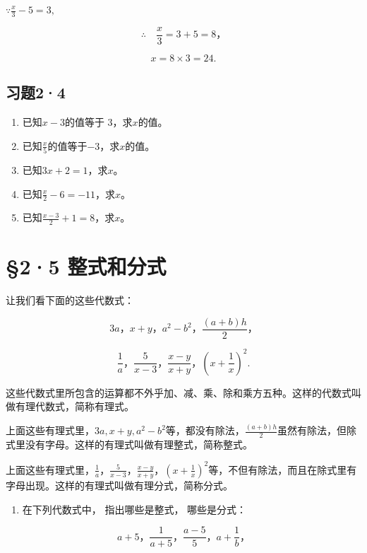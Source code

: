 \(\because \frac{x}{3} - 5 = 3,\)

\[
\therefore \quad \frac{x}{3} = 3 + 5 = 8\text{，}
\]

\[
x = 8 \times 3 = 24.
\]

\subsection{习题2·4}

\begin{enumerate}
\item
  已知\(x - 3\)的值等于 3，求\(x\)的值。
\item
  已知\(\frac{x}{5}\)的值等于\(-3\)，求\(x\)的值。
\item
  已知\(3x + 2 = 1\)，求\(x\)。
\item
  已知\(\frac{x}{2} - 6 = -11\)，求\(x\)。
\item
  已知\(\frac{x - 3}{2} + 1 = 8\)，求\(x\)。
\end{enumerate}

\section{§2·5 整式和分式}

让我们看下面的这些代数式：

\[
3 a\text{，} x + y\text{，} a ^{2} - b ^{2}\text{，} \frac{(a + b) h}{2}\text{，}
\]

\[
\frac{1}{a}\text{，} \frac{5}{x - 3}\text{，} \frac{x - y}{x + y}\text{，} \left(x + \frac{1}{x}\right) ^{2}.
\]

这些代数式里所包含的运算都不外乎加、减、乘、除和乘方五种。这样的代数式叫做有理代数式，简称有理式。

上面这些有理式里，\(3a, x+y, a^{2}-b^{2}\)等，都没有除法，\(\frac{(a+b)h}{2}\)虽然有除法，但除式里没有字母。这样的有理式叫做有理整式，简称整式。

上面这些有理式里，\(\frac{1}{a}\)，\(\frac{5}{x-3}\)，\(\frac{x-y}{x+y}\)，\(\left(x+\frac{1}{x}\right)^{2}\)等，不但有除法，而且在除式里有字母出现。这样的有理式叫做有理分式，简称分式。

\begin{enumerate}
\item
  在下列代数式中， 指出哪些是整式， 哪些是分式：
\end{enumerate}

\[
a + 5\text{，} \frac{1}{a + 5}\text{，} \frac{a - 5}{5}\text{，} a + \frac{1}{b}\text{，}
\]

